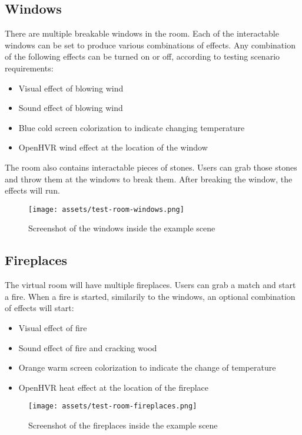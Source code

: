 \hypertarget{x-windows}{\subsection{Windows}}
There are multiple breakable windows in the room. Each of the interactable
windows can be set to produce various combinations of effects. Any combination
of the following effects can be turned on or off, according to testing
scenario requirements:


\begin{itemize}

\item Visual effect of blowing wind
\item Sound effect of blowing wind
\item Blue cold screen colorization to indicate changing temperature
\item OpenHVR wind effect at the location of the window

\end{itemize}


The room also contains interactable pieces of stones. Users can grab those
stones and throw them at the windows to break them. After breaking the window,
the effects will run.


\begin{figure}[h]{}
\centering\texttt{[image: assets/test-room-windows.png]}
\caption{Screenshot of the windows inside the example scene}

\end{figure}

\hypertarget{x-fireplaces}{\subsection{Fireplaces}}
The virtual room will have multiple fireplaces. Users can grab a match and
start a fire. When a fire is started, similarily to the windows, an optional
combination of effects will start:


\begin{itemize}

\item Visual effect of fire

\item Sound effect of fire and cracking wood

\item Orange warm screen colorization to indicate the change of temperature

\item OpenHVR heat effect at the location of the fireplace

\end{itemize}


\begin{figure}[h]{}
\centering\texttt{[image: assets/test-room-fireplaces.png]}
\caption{Screenshot of the fireplaces inside the example scene}

\end{figure}